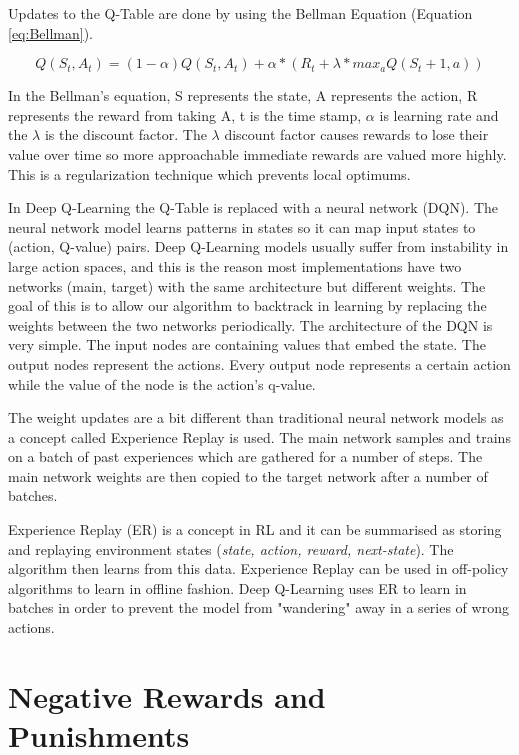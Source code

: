 \documentclass[b5paper]{book}
\begin{document}
Updates to the Q-Table are done by using the Bellman Equation (Equation \ref{eq:Bellman}).

\begin{equation}
\label{eq:Bellman}
Q(S_t, A_t) = (1 - \alpha) Q(S_t, A_t) + \alpha * (R_t + \lambda * max_a Q(S_t+1, a))
\end{equation}

In the Bellman's equation, S represents the state, A represents the action, R represents the reward from taking A, t is the time stamp, \(\alpha\) is learning rate and the \(\lambda\) is the discount factor. The \(\lambda\) discount factor causes rewards to lose their value over time so more approachable immediate rewards are valued more highly. This is a regularization technique which prevents local optimums.

In Deep Q-Learning the Q-Table is replaced with a neural network (DQN). The neural network model learns patterns in states so it can map input states to (action, Q-value) pairs. Deep Q-Learning models usually suffer from instability in large action spaces, and this is the reason most implementations have two networks (main, target) with the same architecture but different weights. The goal of this is to allow our algorithm to backtrack in learning by replacing the weights between the two networks periodically. The architecture of the DQN is very simple. The input nodes are containing values that embed the state. The output nodes represent the actions. Every output node represents a certain action while the value of the node is the action's q-value. 

The weight updates are a bit different than traditional neural network models as a concept called Experience Replay is used. The main network samples and trains on a batch of past experiences which are gathered for a number of steps. The main network weights are then copied to the target network after a number of batches.

Experience Replay (ER) is a concept in RL and it can be summarised as storing and replaying environment states (\emph{state, action, reward, next-state}). The algorithm then learns from this data. Experience Replay can be used in off-policy algorithms to learn in offline fashion. Deep Q-Learning uses ER to learn in batches in order to prevent the model from "wandering" away in a series of wrong actions.

\section{Negative Rewards and Punishments}
\end{document}
